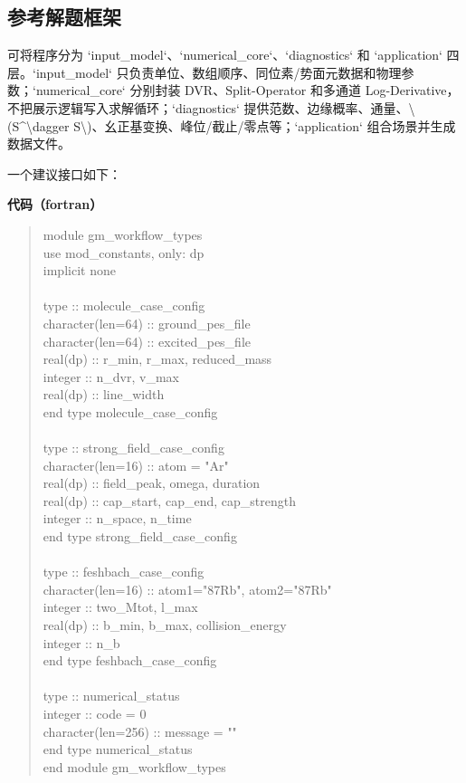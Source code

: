\documentclass[UTF8,openany,11pt,fontset=fandol]{ctexbook}
\begin{document}
\subsection{\texorpdfstring{\textbf{参考解题框架}}{参考解题框架}}\label{ux53c2ux8003ux89e3ux9898ux6846ux67b6}

可将程序分为 `input\_model`、`numerical\_core`、`diagnostics` 和
`application` 四层。`input\_model`
只负责单位、数组顺序、同位素/势面元数据和物理参数；`numerical\_core`
分别封装 DVR、Split-Operator 和多通道
Log-Derivative，不把展示逻辑写入求解循环；`diagnostics`
提供范数、边缘概率、通量、\textbackslash(S\^{}\textbackslash dagger
S\textbackslash)、幺正基变换、峰位/截止/零点等；`application`
组合场景并生成数据文件。

一个建议接口如下：

\textbf{代码（fortran）}

\begin{quote}
module gm\_workflow\_types\\
use mod\_constants, only: dp\\
implicit none\\
~\\
type :: molecule\_case\_config\\
character(len=64) :: ground\_pes\_file\\
character(len=64) :: excited\_pes\_file\\
real(dp) :: r\_min, r\_max, reduced\_mass\\
integer :: n\_dvr, v\_max\\
real(dp) :: line\_width\\
end type molecule\_case\_config\\
~\\
type :: strong\_field\_case\_config\\
character(len=16) :: atom = "Ar"\\
real(dp) :: field\_peak, omega, duration\\
real(dp) :: cap\_start, cap\_end, cap\_strength\\
integer :: n\_space, n\_time\\
end type strong\_field\_case\_config\\
~\\
type :: feshbach\_case\_config\\
character(len=16) :: atom1="87Rb", atom2="87Rb"\\
integer :: two\_Mtot, l\_max\\
real(dp) :: b\_min, b\_max, collision\_energy\\
integer :: n\_b\\
end type feshbach\_case\_config\\
~\\
type :: numerical\_status\\
integer :: code = 0\\
character(len=256) :: message = ""\\
end type numerical\_status\\
end module gm\_workflow\_types
\end{quote}
\end{document}
